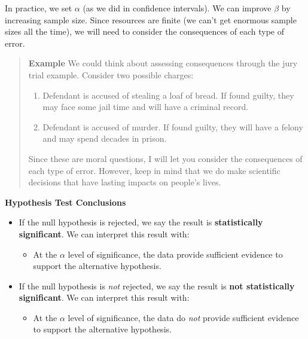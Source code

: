 \documentclass[
]{book}
\providecommand{\tightlist}{%
  \setlength{\itemsep}{0pt}\setlength{\parskip}{0pt}}
\begin{document}
In practice, we set \(\alpha\) (as we did in confidence intervals). We can improve \(\beta\) by increasing sample size. Since resources are finite (we can't get enormous sample sizes all the time), we will need to consider the consequences of each type of error.

\begin{quote}
\textbf{Example} We could think about assessing consequences through the jury trial example. Consider two possible charges:

\begin{enumerate}
\def\labelenumi{\arabic{enumi}.}
\tightlist
\item
  Defendant is accused of stealing a loaf of bread. If found guilty, they may face some jail time and will have a criminal record.
\item
  Defendant is accused of murder. If found guilty, they will have a felony and may spend decades in prison.
\end{enumerate}

Since these are moral questions, I will let you consider the consequences of each type of error. However, keep in mind that we do make scientific decisions that have lasting impacts on people's lives.
\end{quote}

\textbf{Hypothesis Test Conclusions}

\begin{itemize}
\tightlist
\item
  If the null hypothesis is rejected, we say the result is \textbf{statistically significant}. We can interpret this result with:

  \begin{itemize}
  \tightlist
  \item
    At the \(\alpha\) level of significance, the data provide sufficient evidence to support the alternative hypothesis.
  \end{itemize}
\item
  If the null hypothesis is \emph{not} rejected, we say the result is \textbf{not statistically significant}. We can interpret this result with:

  \begin{itemize}
  \tightlist
  \item
    At the \(\alpha\) level of significance, the data do \emph{not} provide sufficient evidence to support the alternative hypothesis.
  \end{itemize}
\end{itemize}
\end{document}
